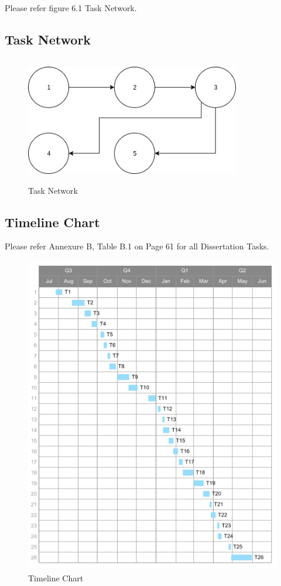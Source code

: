 \documentclass[oneside,a4paper,12pt]{pictreport}
\begin{document}
\par Please refer figure 6.1 Task Network.
\newpage
\subsection{Task Network}
\begin{figure}[!h]
\centering
\includegraphics[width=3.7in,height=2.2in]{task.jpg}
\caption{Task Network}
\end{figure}
\newpage
\subsection{Timeline Chart}
Please refer Annexure B, Table B.1 on Page 61 for all Dissertation Tasks.
\vspace{5mm}
\begin{figure}[!h]
\centering
\includegraphics[width=5.5in,height=5.5in]{timeline.png}
\caption{Timeline Chart}
\end{figure}
\end{document}

